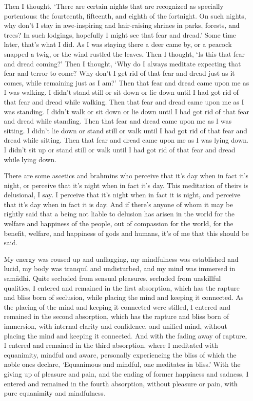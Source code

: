 \documentclass[12pt,openany]{book}%
\begin{document}
Then I thought, ‘There are certain nights that are recognized as specially portentous: the fourteenth, fifteenth, and eighth of the fortnight. On such nights, why don’t I stay in awe-inspiring and hair-raising shrines in parks, forests, and trees? In such lodgings, hopefully I might see that fear and dread.’ Some time later, that’s what I did. As I was staying there a deer came by, or a peacock snapped a twig, or the wind rustled the leaves. Then I thought, ‘Is this that fear and dread coming?’ Then I thought, ‘Why do I always meditate expecting that fear and terror to come? Why don’t I get rid of that fear and dread just as it comes, while remaining just as I am?’ Then that fear and dread came upon me as I was walking. I didn’t stand still or sit down or lie down until I had got rid of that fear and dread while walking. Then that fear and dread came upon me as I was standing. I didn’t walk or sit down or lie down until I had got rid of that fear and dread while standing. Then that fear and dread came upon me as I was sitting. I didn’t lie down or stand still or walk until I had got rid of that fear and dread while sitting. Then that fear and dread came upon me as I was lying down. I didn’t sit up or stand still or walk until I had got rid of that fear and dread while lying down. 

There are some ascetics and brahmins who perceive that it’s day when in fact it’s night, or perceive that it’s night when in fact it’s day. This meditation of theirs is delusional, I say. I perceive that it’s night when in fact it is night, and perceive that it’s day when in fact it is day. And if there’s anyone of whom it may be rightly said that a being not liable to delusion has arisen in the world for the welfare and happiness of the people, out of compassion for the world, for the benefit, welfare, and happiness of gods and humans, it’s of me that this should be said. 

My energy was roused up and unflagging, my mindfulness was established and lucid, my body was tranquil and undisturbed, and my mind was immersed in \textsanskrit{samādhi}. Quite secluded from sensual pleasures, secluded from unskillful qualities, I entered and remained in the first absorption, which has the rapture and bliss born of seclusion, while placing the mind and keeping it connected. As the placing of the mind and keeping it connected were stilled, I entered and remained in the second absorption, which has the rapture and bliss born of immersion, with internal clarity and confidence, and unified mind, without placing the mind and keeping it connected. And with the fading away of rapture, I entered and remained in the third absorption, where I meditated with equanimity, mindful and aware, personally experiencing the bliss of which the noble ones declare, ‘Equanimous and mindful, one meditates in bliss.’ With the giving up of pleasure and pain, and the ending of former happiness and sadness, I entered and remained in the fourth absorption, without pleasure or pain, with pure equanimity and mindfulness. 
\end{document}
